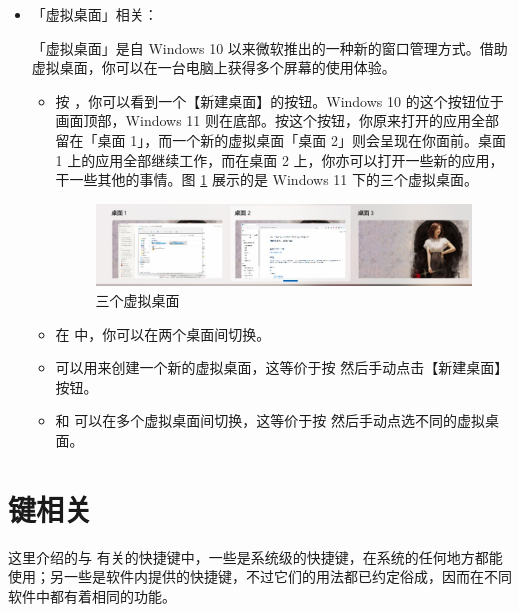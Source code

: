 \begin{itemize}
  \item 「虚拟桌面」相关：

  「虚拟桌面」是自 Windows 10 以来微软推出的一种新的窗口管理方式。借助虚拟桌面，你可以在一台电脑上获得多个屏幕的使用体验。
  \begin{itemize}
    \item 按 ，你可以看到一个【新建桌面】的按钮。Windows 10 的这个按钮位于画面顶部，Windows 11 则在底部。按这个按钮，你原来打开的应用全部留在「桌面 1」，而一个新的虚拟桌面「桌面 2」则会呈现在你面前。桌面 1 上的应用全部继续工作，而在桌面 2 上，你亦可以打开一些新的应用，干一些其他的事情。图 \ref{Virtual_desktop} 展示的是 Windows 11 下的三个虚拟桌面。
    \begin{figure}[htb!]
      \centering
      \includegraphics[width=10cm]{assets/Virtual_desktop.jpg}
      \caption{三个虚拟桌面}
      \label{Virtual_desktop}
    \end{figure}
    \item 在  中，你可以在两个桌面间切换。    
    \item {} 可以用来创建一个新的虚拟桌面，这等价于按  然后手动点击【新建桌面】按钮。
    \item {} 和  可以在多个虚拟桌面间切换，这等价于按  然后手动点选不同的虚拟桌面。
  \end{itemize}
\end{itemize}

\section{ 键相关}

这里介绍的与  有关的快捷键中，一些是系统级的快捷键，在系统的任何地方都能使用；另一些是软件内提供的快捷键，不过它们的用法都已约定俗成，因而在不同软件中都有着相同的功能。

